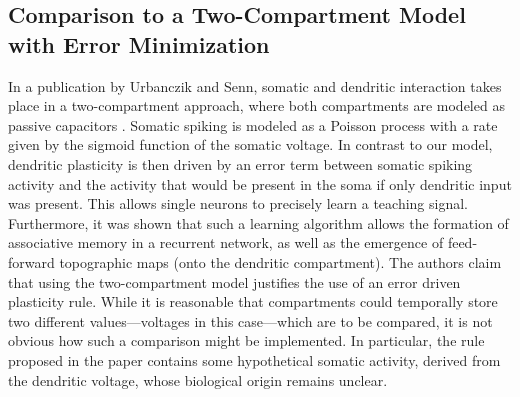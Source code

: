 \documentclass[10pt,a4paper]{article}
\begin{document}
\subsection{Comparison to a Two-Compartment Model with Error Minimization}
In a publication by Urbanczik and Senn, somatic and dendritic interaction takes place in a two-compartment approach, where both compartments are modeled as passive capacitors \cite{Urbanczik_2014}. Somatic spiking is modeled as a Poisson process with a rate given by the sigmoid function of the somatic voltage. In contrast to our model, dendritic plasticity is then driven by an error term between somatic spiking activity and the activity that would be present in the soma if only dendritic input was present. This allows single neurons to precisely learn a teaching signal. Furthermore, it was shown that such a learning algorithm allows the formation of associative memory in a recurrent network, as well as the emergence of feed-forward topographic maps (onto the dendritic compartment). The authors claim that using the two-compartment model justifies the use of an error driven plasticity rule. While it is reasonable that compartments could temporally store two different values---voltages in this case---which are to be compared, it is not obvious how such a comparison might be implemented. In particular, the rule proposed in the paper contains some hypothetical somatic activity, derived from the dendritic voltage, whose biological origin remains unclear.




\end{document}
